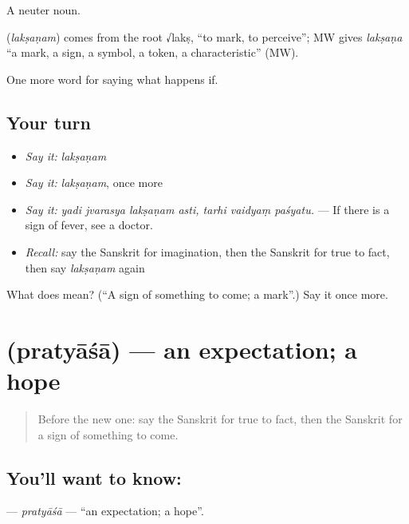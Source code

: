 A neuter noun.

\begin{cousinweb}
\textbf{} (\emph{lakṣaṇam}) comes from the root √lakṣ, \textquotedblleft{}to mark, to perceive\textquotedblright{}; MW gives \emph{lakṣaṇa} \textquotedblleft{}a mark, a sign, a symbol, a token, a characteristic\textquotedblright{} (MW).
\end{cousinweb}

\begin{grammarlens}[title={What you've built}]
One more word for saying what happens if.
\end{grammarlens}

\subsection*{Your turn}
\begin{itemize}
\raggedright
  \item \emph{Say it:} \emph{lakṣaṇam}
  \item \emph{Say it:} \emph{lakṣaṇam}, once more
  \item \emph{Say it:} \emph{yadi jvarasya lakṣaṇam asti, tarhi vaidyaṃ paśyatu.} — If there is a sign of fever, see a doctor.
  \item \emph{Recall:} say the Sanskrit for imagination, then the Sanskrit for true to fact, then say \emph{lakṣaṇam} again
\end{itemize}

\begin{tcolorbox}[breakable,colback=teal!4,colframe=teal!35!black,title={Before you move on}]
What does  mean? (\textquotedblleft{}A sign of something to come; a mark\textquotedblright{}.) Say it once more.
\end{tcolorbox}
\section[\texorpdfstring{\sk{प्रत्याशा} (pratyāśā)}{प्रत्याशा (pratyāśā)}]{ (pratyāśā) — an expectation; a hope}

\label{lesson:SA-C390-pratyasa}



\begin{quote}
Before the new one: say the Sanskrit for true to fact, then the Sanskrit for a sign of something to come.
\end{quote}

\subsection*{You'll want to know: }
\textbf{} — \emph{pratyāśā} — \textquotedblleft{}an expectation; a hope\textquotedblright{}.

